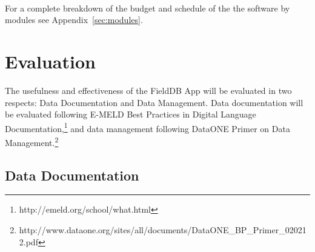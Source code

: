 \documentclass[12 pt]{article}
\begin{document}
~\\
For a complete breakdown of the budget and schedule of the the software by modules see Appendix~\ref{sec:modules}.





\normalsize




\section {Evaluation}



The usefulness and effectiveness of the FieldDB App will be evaluated in two respects: Data Documentation and Data Management. Data documentation will be evaluated following E-MELD Best Practices in Digital Language Documentation,\footnote{http://emeld.org/school/what.html} and data management following DataONE Primer on Data Management.\footnote{http://www.dataone.org/sites/all/documents/DataONE\_BP\_Primer\_020212.pdf}



\subsection {Data Documentation }
\end{document}
